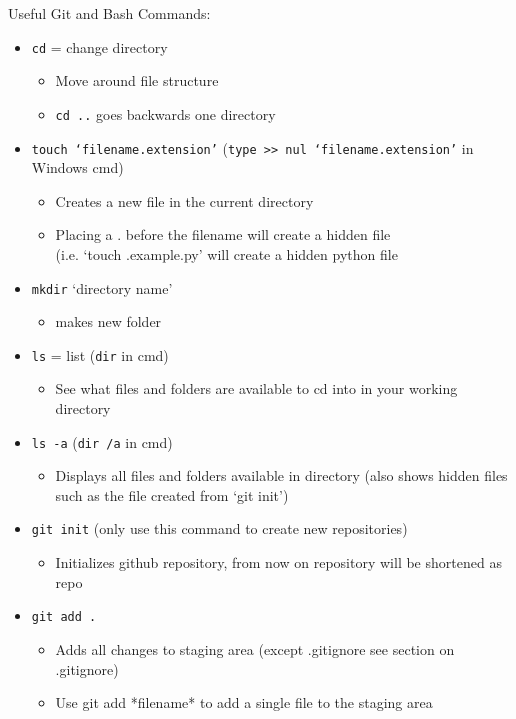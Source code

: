\documentclass[12pt, letterpaper]{article}
\begin{document}
Useful Git and Bash Commands:
\begin{itemize}
	\item \texttt{cd} = change directory
	\begin{itemize}
		\item Move around file structure
		\item \texttt{cd ..} goes backwards one directory
	\end{itemize}
	\item \texttt{touch ‘filename.extension’} (\texttt{type >> nul ‘filename.extension’} in Windows cmd)
	\begin{itemize}
		\item Creates a new file in the current directory
		\item Placing a . before the filename will create a hidden file\\
		(i.e. ‘touch .example.py’ will create a hidden python file
	\end{itemize}
	\item \texttt{mkdir} ‘directory name’
	\begin{itemize}
		\item makes new folder
	\end{itemize}
	\item \texttt{ls} = list (\texttt{dir} in cmd)
	\begin{itemize}
		\item See what files and folders are available to cd into in your working directory
	\end{itemize}
	\item \texttt{ls -a} (\texttt{dir /a} in cmd)
	\begin{itemize}
		\item Displays all files and folders available in directory (also shows hidden files such as the file created from ‘git init’)
	\end{itemize}
	\item \texttt{git init} (only use this command to create new repositories)
	\begin{itemize}
		\item Initializes github repository, from now on repository will be shortened as repo
	\end{itemize}
	\item \texttt{git add .}
	\begin{itemize}
		\item Adds all changes to staging area (except .gitignore see section on .gitignore)
		\item Use git add *filename* to add a single file to the staging area

\end{itemize}
\end{itemize}
\end{document}

